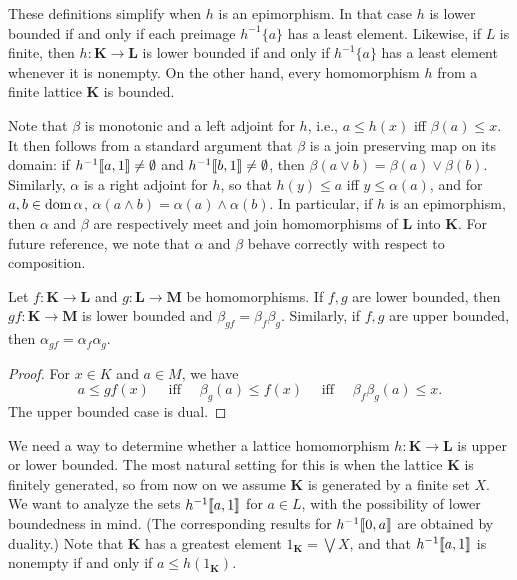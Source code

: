 These definitions simplify when $h$ is an epimorphism.
In that case $h$ is lower bounded if and only if each preimage 
$h^{-1}\{ a \}$ has a least element.
Likewise, if $L$ is finite, then $h \colon \mathbf K \to \mathbf L$ is lower 
bounded if and only if $h^{-1}\{a\}$ has a least element whenever it is nonempty. 
On the other hand, every homomorphism $h$ from a finite lattice $\mathbf K$ is bounded.

Note that $\beta$  is monotonic and a left adjoint for $h$, i.e., $a \leq h(x)$ iff
$\beta (a) ≤ x$. It then follows from a standard argument that $\beta$  is a join
preserving map on its domain: if $h^{-1}\llbracket a, 1 \rrbracket \neq \emptyset$ and
$h^{-1}\llbracket b, 1 \rrbracket \neq \emptyset$, then
$\beta (a \vee b) = \beta (a) \vee \beta (b)$.
Similarly, $\alpha$  is a right adjoint for $h$, so that $h(y) \leq a$ iff
$y \leq \alpha (a)$, and for $a, b \in \operatorname{dom} \alpha$,
$\alpha (a \wedge b) = \alpha (a) \wedge \alpha (b)$.
In particular, if $h$ is an epimorphism, then $\alpha$  and $\beta$  are respectively
meet and join homomorphisms of $\mathbf L$ into $\mathbf K$.
For future reference, we note that $\alpha$  and $\beta$  behave correctly with
respect to composition.

\begin{theorem}
  Let $f \colon  \mathbf K \to \mathbf L$ and $g \colon \mathbf L \to \mathbf M$ be
  homomorphisms. If $f, g$ are lower bounded, then $gf \colon  \mathbf K \to  \mathbf M$ is lower
  bounded and $\beta_{gf} = \beta_f \beta_g$. Similarly, if $f, g$
  are upper bounded, then $\alpha_{gf} = \alpha_f \alpha_g$.
\end{theorem}
\begin{proof}  For $x \in K$ and $a \in M$, we have
  \[ a \leq gf (x) \quad \text{ iff } \quad \beta_g(a) \leq f (x)
  \quad \text{ iff } \quad \beta_f \beta_g (a) \leq x.
  \]
  The upper bounded case is dual.
\end{proof}

We need a way to determine whether a lattice homomorphism
$h\colon \mathbf K \to \mathbf L$
is upper or lower bounded. The most natural setting for this is
when the lattice $\mathbf K$ is finitely generated, so from now on 
we assume $\mathbf K$ is generated by a finite set $X$.
We want to analyze the sets $h^{-1}\llbracket a, 1 \rrbracket$
for $a \in L$, with the possibility of lower boundedness in mind.
(The corresponding results for
$h^{-1}\llbracket 0, a\rrbracket$
are obtained by duality.) Note that $\mathbf K$ has a greatest element 
$1_{\mathbf K} = \bigvee X$, and that $h^{-1}\llbracket a, 1 \rrbracket$ is nonempty 
if and only if $a \leq h(1_{\mathbf K})$.

